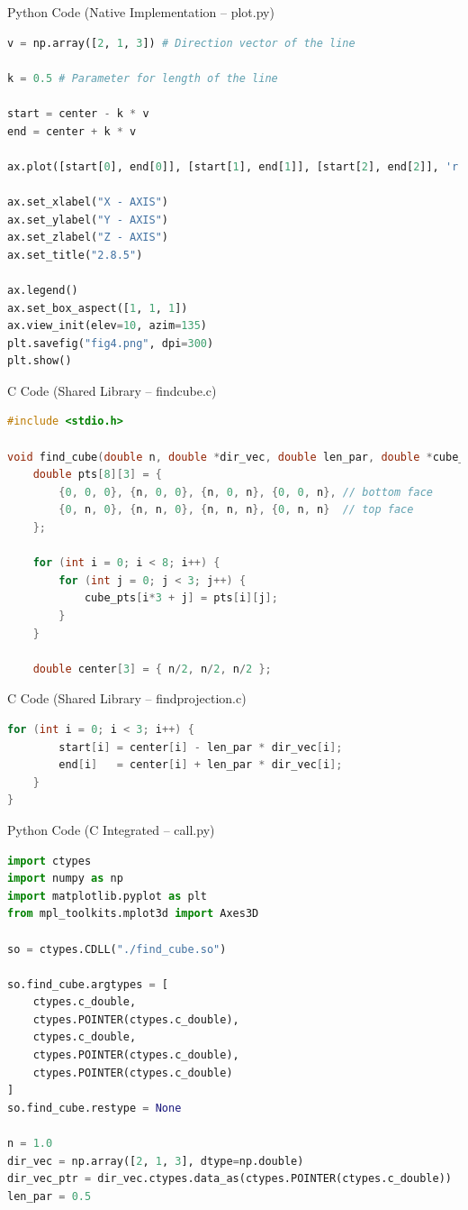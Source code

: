\documentclass{beamer}
\begin{document}
\begin{frame}[fragile]{Python Code (Native Implementation – plot.py)}
\begin{lstlisting}[language=Python]
v = np.array([2, 1, 3]) # Direction vector of the line

k = 0.5 # Parameter for length of the line

start = center - k * v
end = center + k * v

ax.plot([start[0], end[0]], [start[1], end[1]], [start[2], end[2]], 'r', label = 'Line L')

ax.set_xlabel("X - AXIS")
ax.set_ylabel("Y - AXIS")
ax.set_zlabel("Z - AXIS")
ax.set_title("2.8.5")

ax.legend()
ax.set_box_aspect([1, 1, 1])
ax.view_init(elev=10, azim=135)
plt.savefig("fig4.png", dpi=300)
plt.show()

\end{lstlisting}
\end{frame}


\begin{frame}[fragile]{C Code (Shared Library – findcube.c)}
\begin{lstlisting}[language=C]
#include <stdio.h>

void find_cube(double n, double *dir_vec, double len_par, double *cube_pts, double *start, double *end) {
    double pts[8][3] = {
        {0, 0, 0}, {n, 0, 0}, {n, 0, n}, {0, 0, n}, // bottom face
        {0, n, 0}, {n, n, 0}, {n, n, n}, {0, n, n}  // top face
    };

    for (int i = 0; i < 8; i++) {
        for (int j = 0; j < 3; j++) {
            cube_pts[i*3 + j] = pts[i][j];
        }
    }

    double center[3] = { n/2, n/2, n/2 };
\end{lstlisting}
\end{frame}

\begin{frame}[fragile]{C Code (Shared Library – findprojection.c)}
\begin{lstlisting}[language=C]
    for (int i = 0; i < 3; i++) {
        start[i] = center[i] - len_par * dir_vec[i];
        end[i]   = center[i] + len_par * dir_vec[i];
    }
}
\end{lstlisting}
\end{frame}


\begin{frame}[fragile]{Python Code (C Integrated – call.py)
}
\begin{lstlisting}[language=Python]
import ctypes
import numpy as np
import matplotlib.pyplot as plt
from mpl_toolkits.mplot3d import Axes3D

so = ctypes.CDLL("./find_cube.so")

so.find_cube.argtypes = [
    ctypes.c_double,
    ctypes.POINTER(ctypes.c_double),
    ctypes.c_double,
    ctypes.POINTER(ctypes.c_double),
    ctypes.POINTER(ctypes.c_double)
]
so.find_cube.restype = None

n = 1.0
dir_vec = np.array([2, 1, 3], dtype=np.double)
dir_vec_ptr = dir_vec.ctypes.data_as(ctypes.POINTER(ctypes.c_double))
len_par = 0.5
\end{lstlisting}
\end{frame}
\end{document}
